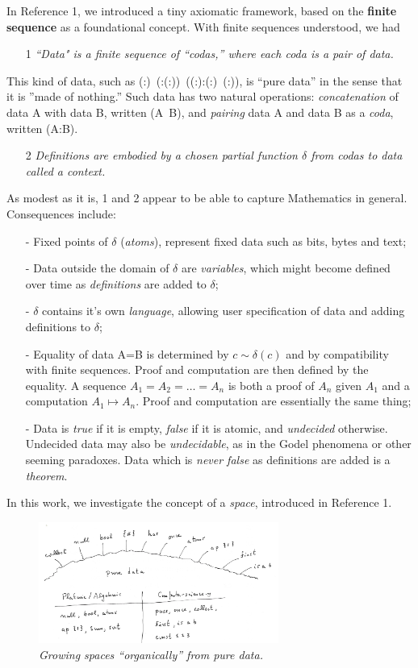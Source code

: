 \documentclass[11pt]{article}
\begin{document}
In Reference 1, we introduced a tiny axiomatic framework, based on the {\bf finite sequence} as a foundational concept.  
With finite sequences understood, we had 
\begin{itemize}
\item[1 ]{\it ``Data" is a finite sequence of ``codas,'' where each coda is a pair of data.}
\end{itemize}
\noindent This kind of data, such as (:)\ (:(:))\ ((:):(:)\ (:)), is ``pure data'' in the sense that it is ''made of nothing.'' Such data has two natural operations: 
{\it concatenation} of data A with data B, written (A\ B), and {\it pairing} data A and data B as a {\it coda}, written (A:B).  
\begin{itemize}
\item[2 ]{\it Definitions are embodied by a chosen partial function $\delta$ from codas to data called a context.}
\end{itemize}
As modest as it is, 1 and 2 appear to be able to capture Mathematics in general.  Consequences include:   
\begin{itemize}
\item[-]{Fixed points of $\delta$ ({\it atoms}), represent fixed data such as bits, bytes and text;}
\item[-]{Data outside the domain of $\delta$ are {\it variables}, which might become defined over time as {\it definitions} are added to $\delta$;} 
\item[-]{$\delta$ contains it's own {\it language}, allowing user specification of data and adding definitions to $\delta$;} 
\item[-]{Equality of data A=B is determined by $c\sim\delta(c)$ and by compatibility with finite sequences. Proof and computation are then defined by the equality.  A sequence $A_1=A_2=\dots=A_n$ is both a proof of $A_n$ given $A_1$ and a computation $A_1\mapsto A_n$.  Proof and computation are essentially the same thing;}
\item[-]{Data is {\it true} if it is empty, {\it false} if it is atomic, and {\it undecided} otherwise.  Undecided data may also be {\it undecidable}, as in the Godel phenomena or other seeming paradoxes.  Data which is {\it never false} as definitions are added is a {\it theorem}.}
\end{itemize}

In this work, we investigate the concept of a {\it space}, introduced in Reference 1.  

\begin{figure}[h]
\centering
\includegraphics[width=0.7\textwidth]{garden.png}
\caption{{\it Growing spaces ``organically'' from pure data.}}
\end{figure}
\end{document}
